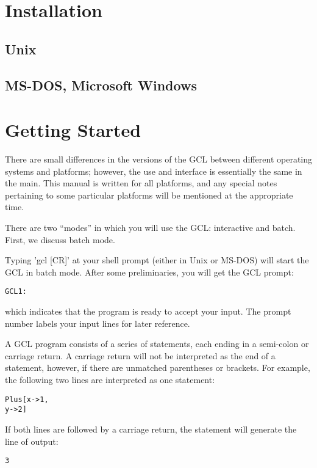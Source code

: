 \section{Installation}

\subsection{Unix}

\subsection{MS-DOS, Microsoft Windows}


\section{Getting Started}

There are small differences in the versions of the GCL between different
operating systems and platforms; however, the use and interface is
essentially the same in the main.  This manual is written for all platforms,
and any special notes pertaining to some particular platforms will be mentioned
at the appropriate time.

There are two ``modes'' in which you will use the GCL: interactive and batch.
First, we discuss batch mode.

Typing 'gcl [CR]' at your shell prompt (either in Unix or MS-DOS) will start
the GCL in batch mode.  After some preliminaries, you will get the GCL
prompt:
\begin{verbatim}
GCL1:
\end{verbatim}

which indicates that the program is ready to accept your input.  The prompt
number labels your input lines for later reference.

A GCL program consists of a series of statements, each ending in a
semi-colon or carriage return. A carriage return will not be
interpreted as the end of a statement, however, if there are unmatched
parentheses or brackets.  For example, the following two lines are
interpreted as one statement:

\begin{verbatim}
Plus[x->1, 
y->2]
\end{verbatim}

If both lines are followed by a carriage return, the statement will
generate the line of output:

\begin{verbatim}
3
\end{verbatim}


